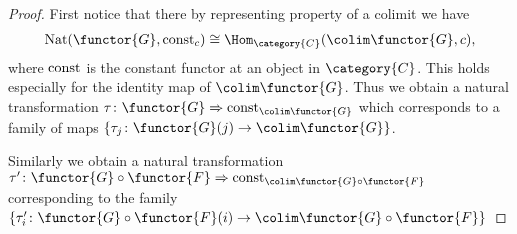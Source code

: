\begin{proof}
  First notice that there by representing property of a colimit we
  have
  \begin{align*}
    \Nat(\functor{G}, \Const_c) \cong \Hom_{\category{C}}( \colim \functor{G} ,
    c ),
  \end{align*}
  where $\mathrm{const}$ is the constant functor at an object in
  $\category{C}$.
  This holds especially for the identity map of $\colim
  \functor{G}$. Thus we obtain a natural transformation $\tau \colon
  \functor{G} \Rightarrow \Const_{\colim \functor{G}}$ which
  corresponds to a family of maps $\{\tau_j\colon
  \functor{G}(j)\rightarrow \colim \functor{G}\}$.

  Similarly we obtain a natural transformation $\tau'\colon
  \functor{G} \circ \functor{F} \Rightarrow \Const_{\colim \functor{G}
    \circ \functor{F}}$ corresponding to the family $\{\tau'_i \colon
  \functor{G} \circ \functor{F}(i)\rightarrow \colim \functor{G} \circ
  \functor{F} \}$


\end{proof}
